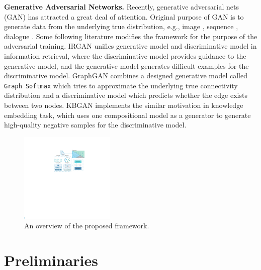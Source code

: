 \documentclass[letterpaper]{article}
\begin{document}
\noindent \textbf{Generative Adversarial Networks.}
Recently, generative adversarial nets (GAN) \cite{GAN} has attracted a great deal of attention. Original purpose of GAN is to generate data from the underlying true distribution, e.g., image \cite{image}, sequence \cite{seq}, dialogue \cite{Dialogue}. Some following literature modifies the framework for the purpose of the adversarial training.
IRGAN \cite{IRGAN} unifies generative model and discriminative model in information retrieval, where the discriminative model provides guidance to the generative model,
and the generative model generates difficult examples for the discriminative model.
GraphGAN \cite{GraphGAN} combines a designed generative model called \texttt{Graph Softmax} which tries to approximate the
underlying true connectivity distribution and a discriminative model which predicts whether the edge exists between two nodes.
KBGAN \cite{KBGAN} implements the similar motivation in knowledge embedding task, which uses one compositional model as a generator to generate high-quality negative samples for the discriminative model.

\begin{figure}[t]
\centering
\includegraphics[width=0.4\textwidth]{framework.pdf}
\caption{An overview of the proposed framework.}
\label{fig:framework}
\end{figure}

\section{Preliminaries}
\end{document}
